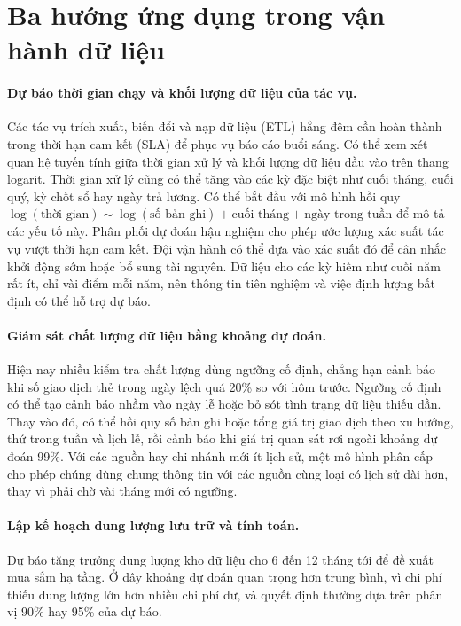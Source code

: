 \documentclass[12pt,a4paper]{report}
\begin{document}
\section{Ba hướng ứng dụng trong vận hành dữ liệu}

\paragraph{Dự báo thời gian chạy và khối lượng dữ liệu của tác vụ.} Các tác vụ trích xuất, biến đổi và nạp dữ liệu (ETL) hằng đêm cần hoàn
thành trong thời hạn cam kết (SLA) để phục vụ báo cáo buổi sáng. Có thể xem xét quan hệ tuyến tính giữa thời gian xử lý và khối lượng dữ liệu
đầu vào trên thang logarit. Thời gian xử lý cũng có thể tăng vào các kỳ đặc biệt như cuối tháng, cuối quý, kỳ chốt sổ
hay ngày trả lương. Có thể bắt đầu với mô hình hồi quy
$\log(\text{thời gian}) \sim \log(\text{số bản ghi}) + \text{cuối tháng} +
\text{ngày trong tuần}$ để mô tả các yếu tố này. Phân phối dự đoán hậu nghiệm cho phép ước lượng
xác suất tác vụ vượt thời hạn cam kết. Đội vận hành có thể dựa vào xác suất đó
để cân nhắc khởi động sớm hoặc bổ sung tài nguyên. Dữ liệu cho các kỳ hiếm như cuối năm rất ít, chỉ vài điểm mỗi
năm, nên thông tin tiên nghiệm và việc định lượng bất định có thể hỗ trợ dự báo.

\paragraph{Giám sát chất lượng dữ liệu bằng khoảng dự đoán.} Hiện nay nhiều kiểm
tra chất lượng dùng ngưỡng cố định, chẳng hạn cảnh báo khi số giao dịch thẻ trong
ngày lệch quá 20\% so với hôm trước. Ngưỡng cố định có thể tạo cảnh báo nhầm vào ngày lễ hoặc
bỏ sót tình trạng dữ liệu thiếu dần. Thay vào đó, có thể hồi quy số bản ghi hoặc tổng
giá trị giao dịch theo xu hướng, thứ trong tuần và lịch lễ, rồi cảnh báo khi giá
trị quan sát rơi ngoài khoảng dự đoán 99\%. Với các nguồn hay chi nhánh mới ít
lịch sử, một mô hình phân cấp cho phép chúng dùng chung thông tin với các nguồn cùng loại có lịch sử dài hơn, thay vì phải chờ vài tháng mới có ngưỡng.

\paragraph{Lập kế hoạch dung lượng lưu trữ và tính toán.} Dự báo tăng trưởng dung
lượng kho dữ liệu cho 6 đến 12 tháng tới để đề xuất mua sắm hạ tầng. Ở đây khoảng
dự đoán quan trọng hơn trung bình, vì chi phí thiếu dung lượng lớn hơn nhiều chi
phí dư, và quyết định thường dựa trên phân vị 90\% hay 95\% của dự báo.
\end{document}
